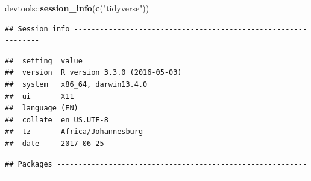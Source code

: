 \documentclass[]{book}
\newenvironment{Shaded}{\begin{snugshade}}{\end{snugshade}}
\newcommand{\KeywordTok}[1]{\textcolor[rgb]{0.13,0.29,0.53}{\textbf{{#1}}}}
\newcommand{\StringTok}[1]{\textcolor[rgb]{0.31,0.60,0.02}{{#1}}}
\newcommand{\NormalTok}[1]{{#1}}
\theoremstyle{definition}
\theoremstyle{definition}
\theoremstyle{remark}
\begin{document}
\begin{Shaded}
\begin{Highlighting}[]
\NormalTok{devtools::}\KeywordTok{session_info}\NormalTok{(}\KeywordTok{c}\NormalTok{(}\StringTok{"tidyverse"}\NormalTok{))}
\end{Highlighting}
\end{Shaded}

\begin{verbatim}
## Session info --------------------------------------------------------------
\end{verbatim}

\begin{verbatim}
##  setting  value                       
##  version  R version 3.3.0 (2016-05-03)
##  system   x86_64, darwin13.4.0        
##  ui       X11                         
##  language (EN)                        
##  collate  en_US.UTF-8                 
##  tz       Africa/Johannesburg         
##  date     2017-06-25
\end{verbatim}

\begin{verbatim}
## Packages ------------------------------------------------------------------
\end{verbatim}
\end{document}
